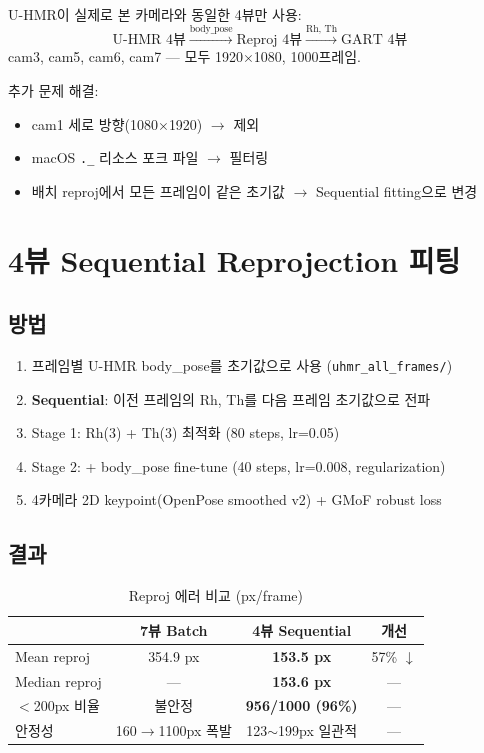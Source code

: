 \documentclass[11pt, a4paper]{report}
\begin{document}
\begin{keyidea}
U-HMR이 실제로 본 카메라와 동일한 4뷰만 사용:
\[
\text{U-HMR 4뷰} \xrightarrow{\text{body\_pose}} \text{Reproj 4뷰} \xrightarrow{\text{Rh, Th}} \text{GART 4뷰}
\]
cam3, cam5, cam6, cam7 --- 모두 1920$\times$1080, 1000프레임.
\end{keyidea}

추가 문제 해결:
\begin{itemize}[leftmargin=*]
  \item cam1 세로 방향(1080$\times$1920) $\rightarrow$ 제외
  \item macOS \texttt{.\_} 리소스 포크 파일 $\rightarrow$ 필터링
  \item 배치 reproj에서 모든 프레임이 같은 초기값 $\rightarrow$ Sequential fitting으로 변경
\end{itemize}


\chapter{4뷰 Sequential Reprojection 피팅}

\section{방법}

\begin{enumerate}[leftmargin=*]
  \item 프레임별 U-HMR body\_pose를 초기값으로 사용 (\texttt{uhmr\_all\_frames/})
  \item \textbf{Sequential}: 이전 프레임의 Rh, Th를 다음 프레임 초기값으로 전파
  \item Stage 1: Rh(3) + Th(3) 최적화 (80 steps, lr=0.05)
  \item Stage 2: + body\_pose fine-tune (40 steps, lr=0.008, regularization)
  \item 4카메라 2D keypoint(OpenPose smoothed v2) + GMoF robust loss
\end{enumerate}

\section{결과}

\begin{table}[H]
\centering
\caption{Reproj 에러 비교 (px/frame)}
\renewcommand{\arraystretch}{1.3}
\begin{tabular}{l ccc}
\toprule
& \textbf{7뷰 Batch} & \textbf{4뷰 Sequential} & \textbf{개선} \\
\midrule
Mean reproj & 354.9 px & \textbf{153.5 px} & 57\% $\downarrow$ \\
Median reproj & --- & \textbf{153.6 px} & --- \\
$<$200px 비율 & 불안정 & \textbf{956/1000 (96\%)} & --- \\
안정성 & 160$\rightarrow$1100px 폭발 & 123$\sim$199px 일관적 & --- \\
\bottomrule
\end{tabular}
\end{table}
\end{document}
